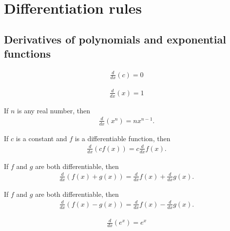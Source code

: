 \documentclass{article}
\begin{document}
\section{Differentiation rules}
\subsection{Derivatives of polynomials and exponential functions}
\begin{theorem}
    \begin{align*}
        \frac{d}{dx}(c) = 0
    \end{align*}
\end{theorem}
\begin{theorem}
    \begin{align*}
        \frac{d}{dx}(x) = 1
    \end{align*}
\end{theorem}
\begin{theorem}
    If $n$ is any real number, then 
    \begin{align*}
        \frac{d}{dx}(x^n) = nx^{n-1}.
    \end{align*}
\end{theorem}
\begin{theorem}
    If $c$ is a constant and $f$ is a differentiable function, then
    \begin{align*}
        \frac{d}{dx}(cf(x))=c\frac{d}{dx}f(x).
    \end{align*}
\end{theorem}
\begin{theorem}
    If $f$ and $g$ are both differentiable, then
    \begin{align*}
        \frac{d}{dx}(f(x)+g(x))=\frac{d}{dx}f(x)+\frac{d}{dx}g(x).
    \end{align*}
\end{theorem}
\begin{theorem}
    If $f$ and $g$ are both differentiable, then
    \begin{align*}
        \frac{d}{dx}(f(x)-g(x))=\frac{d}{dx}f(x)-\frac{d}{dx}g(x).
    \end{align*}
\end{theorem}
\begin{theorem}
    \begin{align*}
        \frac{d}{dx}(e^x)=e^x
    \end{align*}
\end{theorem}
\end{document}

